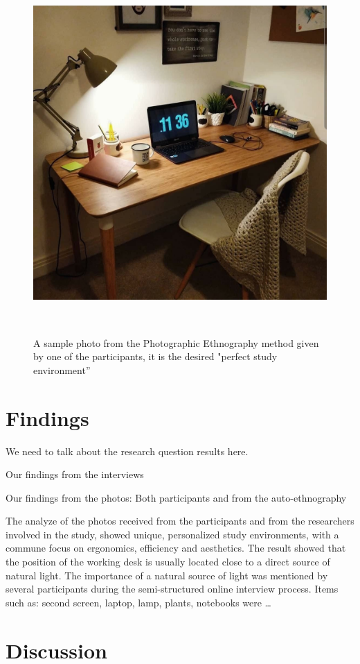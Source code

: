 \documentclass{sigchi}
\begin{document}
\begin{figure}
\centering
  \includegraphics[width=0.9\columnwidth]{figures/perfect-setup}
  \caption{A sample photo from the Photographic Ethnography method given by one of the participants, it is the desired "perfect study environment''}~\label{fig:figure1}
\end{figure}

\section{Findings}

We need to talk about the research question results here.

Our findings from the interviews

Our findings from the photos: Both participants and from the auto-ethnography 


The analyze of the photos received from the participants and from the researchers involved in the study, showed unique, personalized study environments,  with a commune focus on ergonomics, efficiency and aesthetics. The result showed that the position of the working desk is usually located close to a direct source of natural light.  The importance of a natural source of light was mentioned by several participants during the semi-structured online interview process. Items such as: second screen, laptop, lamp, plants, notebooks were … 

\section{Discussion}
\end{document}
